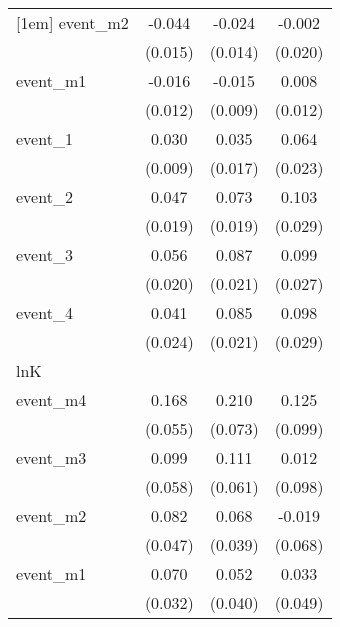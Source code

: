{\begin{tabular}{l*{3}{c}}
[1em]
event\_m2    &      -0.044\sym{**} &      -0.024         &      -0.002         \\
            &     (0.015)         &     (0.014)         &     (0.020)         \\
[1em]
event\_m1    &      -0.016         &      -0.015         &       0.008         \\
            &     (0.012)         &     (0.009)         &     (0.012)         \\
[1em]
event\_1     &       0.030\sym{**} &       0.035\sym{*}  &       0.064\sym{**} \\
            &     (0.009)         &     (0.017)         &     (0.023)         \\
[1em]
event\_2     &       0.047\sym{*}  &       0.073\sym{***}&       0.103\sym{***}\\
            &     (0.019)         &     (0.019)         &     (0.029)         \\
[1em]
event\_3     &       0.056\sym{**} &       0.087\sym{***}&       0.099\sym{***}\\
            &     (0.020)         &     (0.021)         &     (0.027)         \\
[1em]
event\_4     &       0.041         &       0.085\sym{***}&       0.098\sym{***}\\
            &     (0.024)         &     (0.021)         &     (0.029)         \\
\hline
lnK         &                     &                     &                     \\
event\_m4    &       0.168\sym{**} &       0.210\sym{**} &       0.125         \\
            &     (0.055)         &     (0.073)         &     (0.099)         \\
[1em]
event\_m3    &       0.099         &       0.111         &       0.012         \\
            &     (0.058)         &     (0.061)         &     (0.098)         \\
[1em]
event\_m2    &       0.082         &       0.068         &      -0.019         \\
            &     (0.047)         &     (0.039)         &     (0.068)         \\
[1em]
event\_m1    &       0.070\sym{*}  &       0.052         &       0.033         \\
            &     (0.032)         &     (0.040)         &     (0.049)         \\

\end{tabular}}
